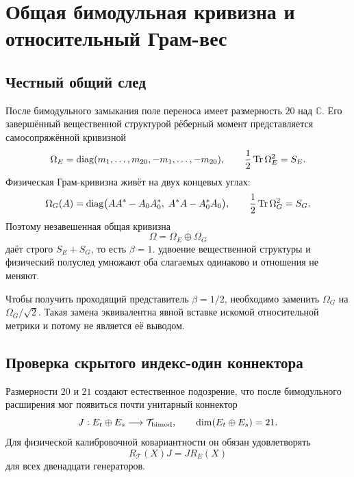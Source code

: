 \chapter{Общая бимодульная кривизна и относительный Грам-вес}
\label{ch:v8-bimodule-common-curvature-relative-weight-gate}

\section{Честный общий след}

После бимодульного замыкания поле переноса имеет размерность $20$ над
$\mathbb C$. Его завершённый вещественной структурой рёберный момент представляется самосопряжённой
кривизной
\begin{equation}
 \Omega_E=\operatorname{diag}(m_1,\ldots,m_{20},-m_1,\ldots,-m_{20}),
 \qquad \frac12\operatorname{Tr}\Omega_E^2=S_E.
 \label{eq:v8-common-edge-curvature}
\end{equation}
Физическая Грам-кривизна живёт на двух концевых углах:
\begin{equation}
 \Omega_G(A)=\operatorname{diag}
 \bigl(AA^*-A_0A_0^*,\;A^*A-A_0^*A_0\bigr),
 \qquad \frac12\operatorname{Tr}\Omega_G^2=S_G.
 \label{eq:v8-common-gram-curvature}
\end{equation}
Поэтому незавешенная общая кривизна
\begin{equation}
 \Omega=\Omega_E\oplus\Omega_G
 \label{eq:v8-unweighted-common-curvature}
\end{equation}
даёт строго $S_E+S_G$, то есть $\beta=1$. удвоение вещественной структуры и физический
полуслед умножают оба слагаемых одинаково и отношения не меняют.

Чтобы получить проходящий представитель $\beta=1/2$, необходимо заменить
$\Omega_G$ на $\Omega_G/\sqrt2$. Такая замена эквивалентна явной вставке
искомой относительной метрики и потому не является её выводом.

\section{Проверка скрытого индекс-один коннектора}

Размерности $20$ и $21$ создают естественное подозрение, что после
бимодульного расширения мог появиться почти унитарный коннектор
\begin{equation}
 J:E_t\oplus E_s\longrightarrow\mathcal T_{\rm bimod},
 \qquad \dim(E_t\oplus E_s)=21.
 \label{eq:v8-index-one-connector-candidate}
\end{equation}
Для физической калибровочной ковариантности он обязан удовлетворять
\begin{equation}
 R_{\mathcal T}(X)J=J R_E(X)
 \label{eq:v8-connector-intertwiner-equation}
\end{equation}
для всех двенадцати генераторов.

